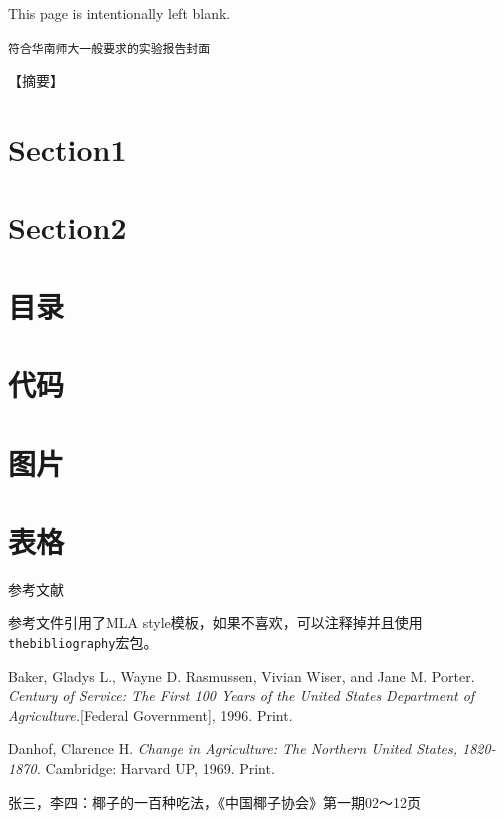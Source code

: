 \documentclass[10.5pt,a4paper,headings]{ctexart}
\newcommand*{\blankpage}{%
\vspace*{\fill}
{\centering\fontsize{32pt}{64pt} This page is intentionally left blank.\par}
\vspace{\fill}}
\newcommand{\bibent}{\noindent \hangindent 40pt}
\newenvironment{workscited}{\newpage \begin{center} 参考文献 \end{center}}{\newpage }
\begin{document}
\blankpage
\newpage
\tableofcontents

\newpage

\begin{center}
\tt 符合华南师大一般要求的实验报告封面
\end{center}
\vspace{6pt}
\setlength{\parindent}{2em}


\onehalfspacing
【摘要】

\doublespacing
\section{Section1}


\section{Section2}

\section{目录}

\section{代码}

\section{图片}

\section{表格}



\begin{workscited}

    \bibent
    参考文件引用了MLA style模板，如果不喜欢，可以注释掉并且使用\texttt{thebibliography}宏包。

    \bibent
    Baker, Gladys L., Wayne D. Rasmussen, Vivian Wiser, and Jane M. Porter. \textit{Century of Service: The First 100 Years of the United States Department of Agriculture.}[Federal Government], 1996. Print.

    \bibent
    Danhof, Clarence H. \textit{Change in Agriculture: The Northern United States, 1820-1870.} Cambridge: Harvard UP, 1969. Print.

    \bibent
    张三，李四：椰子的一百种吃法，《中国椰子协会》第一期02～12页

\end{workscited}
\end{document}
